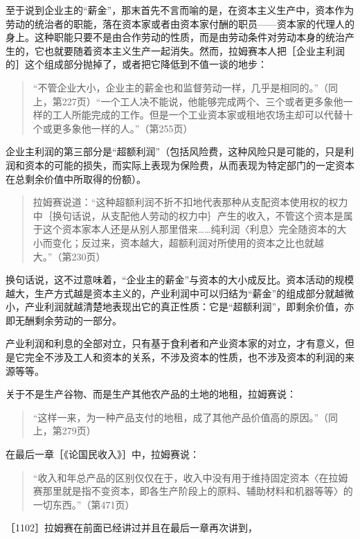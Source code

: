 至于说到企业主的“薪金”，那末首先不言而喻的是，在资本主义生产中，资本作为劳动的统治者的职能，落在资本家或者由资本家付酬的职员——资本家的代理人的身上。这种职能只要不是由合作劳动的性质，而是由劳动条件对劳动本身的统治产生的，它也就要随着资本主义生产一起消失。然而，拉姆赛本人把［企业主利润的］这个组成部分抛掉了，或者把它降低到不值一谈的地步：

\begin{quote}{“不管企业大小，企业主的薪金也和监督劳动一样，几乎是相同的。”（同上，第227页）“一个工人决不能说，他能够完成两个、三个或者更多象他一样的工人所能完成的工作。但是一个工业资本家或租地农场主却可以代替十个或更多象他一样的人。”（第255页）}\end{quote}

企业主利润的第三部分是“超额利润”（包括风险费，这种风险只是可能的，只是利润和资本的可能的损失，而实际上表现为保险费，从而表现为特定部门的一定资本在总剩余价值中所取得的份额）。

\begin{quote}{拉姆赛说道：“这种超额利润不折不扣地代表那种从支配资本使用权的权力中｛换句话说，从支配他人劳动的权力中｝产生的收入，不管这个资本是属于这个资本家本人还是从别人那里借来……纯利润〈利息〉完全随资本的大小而变化；反过来，资本越大，超额利润对所使用的资本之比也就越大。”（第230页）}\end{quote}

换句话说，这不过意味着，“企业主的薪金”与资本的大小成反比。资本活动的规模越大，生产方式越是资本主义的，产业利润中可以归结为“薪金”的组成部分就越微小，产业利润就越清楚地表现出它的真正性质：它是“超额利润”，即剩余价值，亦即无酬剩余劳动的一部分。

产业利润和利息的全部对立，只有基于食利者和产业资本家的对立，才有意义，但是它完全不涉及工人和资本的关系，不涉及资本的性质，也不涉及资本的利润的来源等等。

关于不是生产谷物、而是生产其他农产品的土地的地租，拉姆赛说：

\begin{quote}{“这样一来，为一种产品支付的地租，成了其他产品价值高的原因。”（同上，第279页）}\end{quote}

在最后一章［《论国民收入》］中，拉姆赛说：

\begin{quote}{“收入和年总产品的区别仅仅在于，收入中没有用于维持固定资本〈在拉姆赛那里就是指不变资本，即各生产阶段上的原料、辅助材料和机器等等〉的一切东西。”（第471页）}\end{quote}

［1102］拉姆赛在前面已经讲过并且在最后一章再次讲到，

